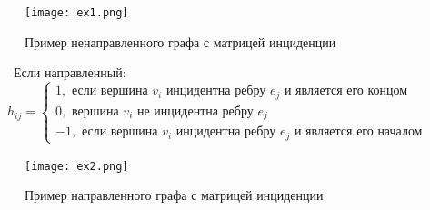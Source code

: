 \documentclass[a4paper,12pt]{article}
\begin{document}
\begin{enumerate}
\begin{figure}[ht]
                    \centering
                    
                    \texttt{[image: ex1.png]}
                    
                    \caption{Пример ненаправленного графа с матрицей инциденции}
                    
                    \label{fig:gn}
                
            \end{figure}
            $\qquad$Если направленный:
                 \begin{equation*}
                    h_{i j} = 
                   \begin{cases}
                       1,  \text{ если вершина } v_i \text{ инцидентна ребру } e_j 
                       \text{ и является его концом}\\
                       0, \text{ вершина }v_i \text{ не инцидентна ребру } e_j\\
                       -1, \text{ если вершина } v_i \text{ инцидентна ребру } e_j 
                       \text{ и является его началом}
                   \end{cases}
                \end{equation*} 
            \begin{figure}[ht]

                    \centering
                    
                    \texttt{[image: ex2.png]}
                    
                    \caption{Пример направленного графа с матрицей инциденции}
                    
                    \label{fig:gd}
                
            \end{figure}
            

\end{enumerate}
\end{document}

